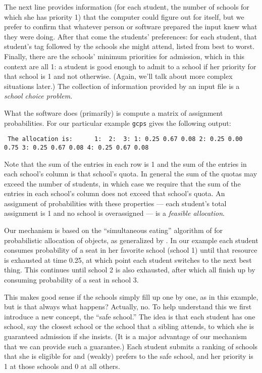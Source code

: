 \documentclass[12pt]{article}
\theoremstyle{definition}
\begin{document}
The next line provides information (for each student, the number of
schools for which she has priority 1) that the computer could figure
out for itself, but we prefer to confirm that whatever person or
software prepared the input knew what they were doing.  After that
come the students' preferences: for each student, that student's tag
followed by the schools she might attend, listed from best to worst.
Finally, there are the schools' minimum priorities for admission,
which in this context are all 1: a student is good enough to admit to
a school if her priority for that school is 1 and not
otherwise. (Again, we'll talk about more complex situations later.)
The collection of information provided by an input file is a
\emph{school choice problem}.

What the software does (primarily) is compute a matrix of assignment
probabilities.  For our particular example \texttt{gcps} gives the
following output:
\medskip
\begin{obeylines}\texttt{
The allocation is:
\ \ \ \ \ 1:    \    2:  \      3:
1:      0.25     0.67     0.08
2:      0.25     0.00     0.75
3:      0.25     0.67     0.08
4:      0.25     0.67     0.08
}
\end{obeylines} \noindent

\smallskip
Note that the sum of the entries in each row is 1 and the sum of the
entries in each school's column is that school's quota.  In general
the sum of the quotas may exceed the number of students, in which case
we require that the sum of the entries in each school's column does
not exceed that school's quota. An assignment of probabilities with
these properties --- each student's total assignment is 1 and no
school is overassigned --- is a \emph{feasible allocation}.  

Our mechanism is based on the ``simultaneous eating'' algorithm of
\cite{bm01} for probabilistic allocation of objects, as generalized by
\cite{balbuzanov22jet}.  In our example each student consumes
probability of a seat in her favorite school (school 1) until that
resource is exhausted at time 0.25, at which point each student
switches to the next best thing.  This continues until school 2 is
also exhausted, after which all finish up by consuming probability of
a seat in school 3.

This makes good sense if the schools simply fill up one by one, as in
this example, but is that always what happens?  Actually, no.  To help
understand this we first introduce a new concept, the ``safe school.''
The idea is that each student has one school, say the closest school
or the school that a sibling attends, to which she is guaranteed
admission if she insists.  (It is a major advantage of our mechanism
that we can provide such a guarantee.)  Each student submits a ranking
of schools that she is eligible for and (weakly) prefers to the safe
school, and her priority is 1 at those schools and 0 at all others.
\end{document}
